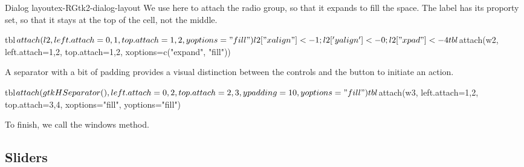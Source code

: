 \begin{example}{Dialog layout}{ex-RGtk2-dialog-layout}
We use  here to attach the radio group, so that it
expands to fill the space. The label has its  proporty
set, so that it stays at the top of the cell, not the middle.
\begin{Schunk}
\begin{Sinput}
 tbl$attach(l2, left.attach=0,1, top.attach=1,2, yoptions="fill")
 l2["xalign"] <- 1; l2['yalign'] <- 0; l2["xpad"] <- 4
 tbl$attach(w2, left.attach=1,2, top.attach=1,2, xoptions=c("expand", "fill"))
\end{Sinput}
\end{Schunk}
A separator with a bit of padding provides a visual distinction
between the controls and the button to initiate an action.
\begin{Schunk}
\begin{Sinput}
 tbl$attach(gtkHSeparator(),left.attach=0,2, top.attach=2,3, ypadding=10, yoptions="fill")
 tbl$attach(w3, left.attach=1,2, top.attach=3,4, xoptions="fill", yoptions="fill")
\end{Sinput}
\end{Schunk}
To finish, we call the windows  method.
\begin{Schunk}
\end{Schunk}
\end{example}


\subsection{Sliders}
\label{sec:RGtk2:sliders}

